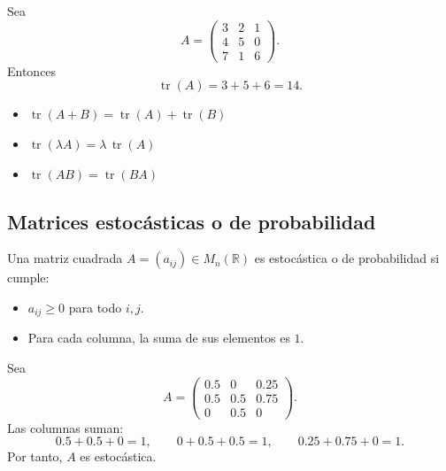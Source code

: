 \documentclass[a4paper,12pt]{article}
\begin{document}
\begin{ejemplo}[title=Ejemplo de traza]
Sea
\[
A=
\begin{pmatrix}
\boxed{3} & 2 & 1 \\
4 & \boxed{5} & 0 \\
7 & 1 & \boxed{6}
\end{pmatrix}.
\]
Entonces
\[
\operatorname{tr}(A)=3+5+6=14.
\]
\end{ejemplo}

\begin{procedimiento}[title=Propiedades de la traza]
\begin{itemize}
    \item $\operatorname{tr}(A+B)=\operatorname{tr}(A)+\operatorname{tr}(B)$
    \item $\operatorname{tr}(\lambda A)=\lambda\,\operatorname{tr}(A)$
    \item $\operatorname{tr}(AB)=\operatorname{tr}(BA)$
\end{itemize}
\end{procedimiento}


\subsection{Matrices estocásticas o de probabilidad}

\begin{procedimiento}[title=Matriz estocástica o de probabilidad]
Una matriz cuadrada $A=(a_{ij})\in M_n(\mathbb{R})$ es estocástica o de probabilidad si cumple:
\begin{itemize}
    \item $a_{ij}\ge 0$ para todo $i,j$.
    \item Para cada columna, la suma de sus elementos es $1$.
\end{itemize}
\end{procedimiento}

\begin{ejemplo}[title=Ejemplo de matriz estocástica]
Sea
\[
A=
\begin{pmatrix}
0\text{.}5 & 0   & 0\text{.}25 \\
0\text{.}5 & 0\text{.}5 & 0\text{.}75 \\
0   & 0\text{.}5 & 0
\end{pmatrix}.
\]
Las columnas suman:
\[
0\text{.}5+0\text{.}5+0=1,\qquad
0+0\text{.}5+0\text{.}5=1,\qquad
0\text{.}25+0\text{.}75+0=1.
\]
Por tanto, $A$ es estocástica.
\end{ejemplo}
\end{document}
